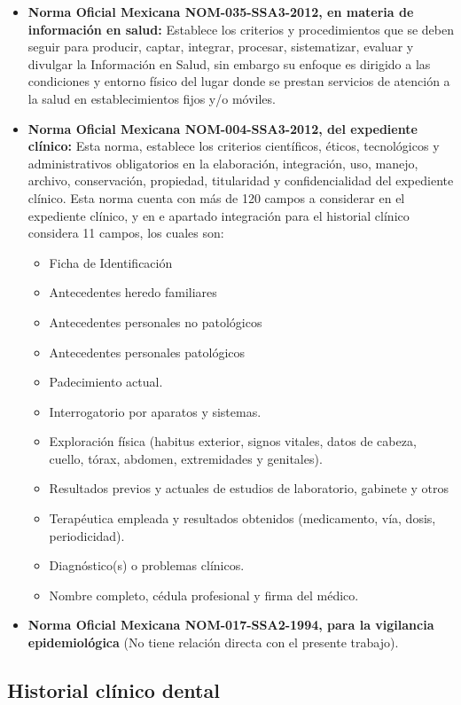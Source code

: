 \begin{itemize}
\item \textbf{Norma Oficial Mexicana NOM-035-SSA3-2012, en materia de información en salud:}  Establece los criterios y procedimientos que se deben seguir para producir, captar, integrar, procesar, sistematizar, evaluar y divulgar la Información en Salud, sin embargo su enfoque es dirigido a las condiciones y entorno físico del lugar donde se prestan servicios de atención a la salud en establecimientos fijos y/o móviles.
\item \textbf{Norma Oficial Mexicana NOM-004-SSA3-2012, del expediente clínico:} Esta norma, establece los criterios científicos, éticos, tecnológicos y administrativos obligatorios en la elaboración, integración, uso, manejo, archivo, conservación, propiedad, titularidad y confidencialidad del expediente clínico. Esta norma cuenta con más de 120 campos a considerar en el expediente clínico, y en e apartado integración para el historial clínico considera 11 campos, los cuales son:
\begin{itemize}
\item Ficha de Identificación
\item Antecedentes heredo familiares
\item Antecedentes personales no patológicos
\item Antecedentes personales patológicos
\item Padecimiento actual.
\item Interrogatorio por aparatos y sistemas.
\item Exploración física (habitus exterior, signos vitales, datos de cabeza, cuello, tórax, abdomen, extremidades y genitales).
\item Resultados previos y actuales de estudios de laboratorio, gabinete y otros
\item Terapéutica empleada y resultados obtenidos (medicamento, vía, dosis, periodicidad).
\item Diagnóstico(s) o problemas clínicos.
\item Nombre completo, cédula profesional y firma del médico.
\end{itemize}
\item \textbf{Norma Oficial Mexicana NOM-017-SSA2-1994, para la vigilancia epidemiológica}  (No tiene relación directa con el presente trabajo).
\end{itemize}




\subsection{Historial clínico dental}

